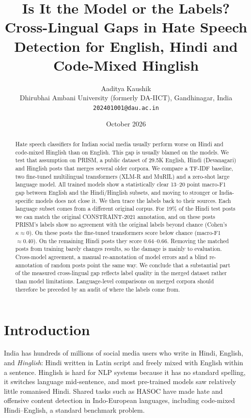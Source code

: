 \documentclass[11pt,a4paper]{article}
\title{Is It the Model or the Labels?\\[2pt]
\large Cross-Lingual Gaps in Hate Speech Detection for English, Hindi and Code-Mixed Hinglish}
\author{Aaditya Kaushik\\
Dhirubhai Ambani University (formerly DA-IICT), Gandhinagar, India\\
\texttt{202401001@dau.ac.in}}
\date{October 2026}
\begin{document}
\maketitle

\begin{center}
\end{center}

\begin{abstract}
Hate speech classifiers for Indian social media usually perform worse on Hindi and code-mixed Hinglish than on English. This gap is usually blamed on the models.
We test that assumption on PRISM, a public dataset of 29.5K English, Hindi (Devanagari) and Hinglish posts that merges several older corpora.
We compare a TF-IDF baseline, two fine-tuned multilingual transformers (XLM-R and MuRIL) and a zero-shot large language model.
All trained models show a statistically clear 13--20 point macro-F1 gap between English and the Hindi/Hinglish subsets, and moving to stronger or India-specific models does not close it.
We then trace the labels back to their sources.
Each language subset comes from a different original corpus.
For 19\% of the Hindi test posts we can match the original CONSTRAINT-2021 annotation, and on these posts PRISM's labels show no agreement with the original labels beyond chance (Cohen's $\kappa \approx 0$).
On these posts the fine-tuned transformers score below chance (macro-F1 $\approx 0.40$). On the remaining Hindi posts they score 0.64--0.66.
Removing the matched posts from training barely changes results, so the damage is mainly to evaluation.
Cross-model agreement, a manual re-annotation of model errors and a blind re-annotation of random posts point the same way.
We conclude that a substantial part of the measured cross-lingual gap reflects label quality in the merged dataset rather than model limitations. Language-level comparisons on merged corpora should therefore be preceded by an audit of where the labels come from.
\end{abstract}

\section{Introduction}

India has hundreds of millions of social media users who write in Hindi, English, and \emph{Hinglish}: Hindi written in Latin script and freely mixed with English within a sentence.
Hinglish is hard for NLP systems because it has no standard spelling, it switches language mid-sentence, and most pre-trained models saw relatively little romanised Hindi.
Shared tasks such as HASOC \citep{mandl2019hasoc,mandl2020hasoc,modha2021hasoc} have made hate and offensive content detection in Indo-European languages, including code-mixed Hindi--English, a standard benchmark problem.
\end{document}
